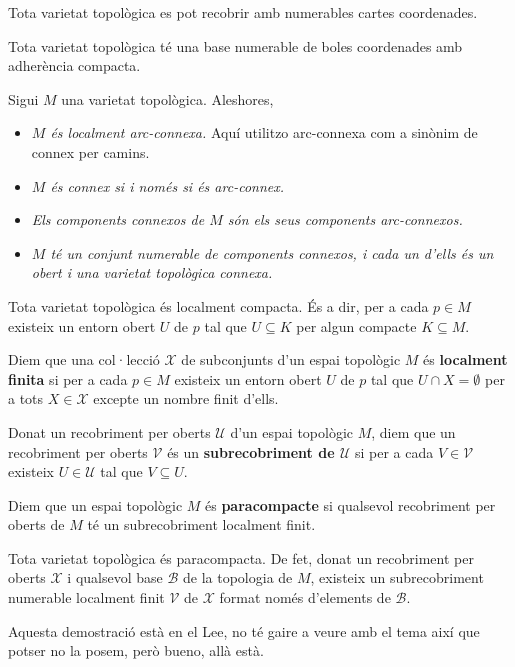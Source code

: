 \begin{lema}
    Tota varietat topològica es pot recobrir amb numerables cartes coordenades.
\end{lema}


\begin{lema}
    Tota varietat topològica té una base numerable de boles coordenades amb adherència compacta.
\end{lema}


\begin{prop}
Sigui $M$ una varietat topològica. Aleshores, 
\end{prop}
{
    \begin{itemize}
        \item \textit{$M$ és localment arc-connexa.}{\color{blue} Aquí utilitzo arc-connexa com a sinònim de connex per camins.}
        \item \textit{$M$ és connex si i només si és arc-connex.}
        \item \textit{Els components connexos de $M$ són els seus components arc-connexos.}
        \item \textit{$M$ té un conjunt numerable de components connexos, i cada un d'ells és un obert i una varietat topològica connexa.}
    \end{itemize}
}
\begin{prop}
    Tota varietat topològica és localment compacta. És a dir, per a cada $p\in M$ existeix un entorn obert $U$ de $p$ tal que $U\subseteq K$ per algun compacte $K\subseteq M$.
\end{prop}
\begin{defi}
    Diem que una col·lecció $\mathcal X$ de subconjunts d'un espai topològic $M$ és \textbf{localment finita} si per a cada $p\in M$ existeix un entorn obert $U$ de $p$ tal que $U\cap X = \emptyset$ per a tots $X\in\mathcal X$ excepte un nombre finit d'ells.
\end{defi}
\begin{defi}
    Donat un recobriment per oberts $\mathcal U$ d'un espai topològic $M$, diem que un recobriment per oberts $\mathcal V$ és un \textbf{subrecobriment de $\mathcal U$} si per a cada $V\in\mathcal V$ existeix $U\in\mathcal U$ tal que $V\subseteq U$.
\end{defi}
\begin{defi}
    Diem que un espai topològic $M$ és \textbf{paracompacte} si qualsevol recobriment per oberts de $M$ té un subrecobriment localment finit.
\end{defi}
\begin{teo}
    Tota varietat topològica és paracompacta. De fet, donat un recobriment per oberts $\mathcal X$ i qualsevol base $\mathcal B$ de la topologia de $M$, existeix un subrecobriment numerable localment finit $\mathcal V$ de $\mathcal X$ format només d'elements de $\mathcal B$.
\end{teo}
{\color{blue} Aquesta demostració està en el Lee, no té gaire a veure amb el tema així que potser no la posem, però bueno, allà està.}
